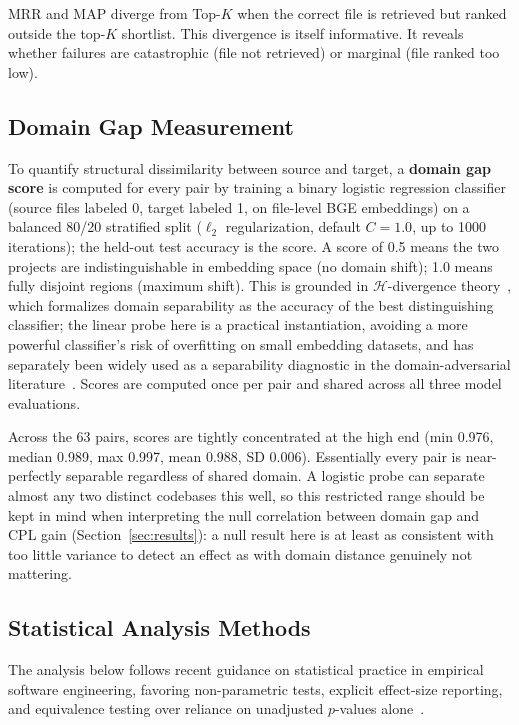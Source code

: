 \documentclass[a4paper,fleqn]{cas-dc}
\begin{document}
 MRR and MAP diverge from Top-$K$ when the correct file is retrieved but ranked
outside the top-$K$ shortlist. This divergence is itself informative. It reveals
whether failures are catastrophic (file not retrieved) or marginal (file ranked
too low).

\subsection{Domain Gap Measurement}
\label{sec:domaingap}

To quantify structural dissimilarity between source and target, a
\textbf{domain gap score} is computed for every pair by training a binary
logistic regression classifier (source files labeled 0, target labeled 1,
on file-level BGE embeddings) on a balanced 80/20 stratified split
($\ell_2$ regularization, default $C=1.0$, up to 1000 iterations); the
held-out test accuracy is the score. A score of 0.5 means the two projects
are indistinguishable in embedding space (no domain shift); 1.0 means fully
disjoint regions (maximum shift). This is grounded in
$\mathcal{H}$-divergence theory~\citep{bendavid2010theory}, which formalizes
domain separability as the accuracy of the best distinguishing classifier;
the linear probe here is a practical instantiation, avoiding a more
powerful classifier's risk of overfitting on small embedding datasets, and
has separately been widely used as a separability diagnostic in the
domain-adversarial literature~\citep{ganin2016domain}. Scores are computed
once per pair and shared across all three model evaluations.

Across the 63 pairs, scores are tightly concentrated at the high end
(min 0.976, median 0.989, max 0.997, mean 0.988, SD 0.006). Essentially
every pair is near-perfectly separable regardless of shared domain. A
logistic probe can separate almost any two distinct codebases this well,
so this restricted range should be kept in mind when interpreting the null
correlation between domain gap and CPL gain (Section~\ref{sec:results}): a
null result here is at least as consistent with too little variance to
detect an effect as with domain distance genuinely not mattering.

\subsection{Statistical Analysis Methods}
\label{sec:statmethods}

The analysis below follows recent guidance on statistical practice in empirical
software engineering, favoring non-parametric tests, explicit effect-size
reporting, and equivalence testing over reliance on unadjusted $p$-values
alone~\citep{oliveira2019evolution}.
\end{document}
